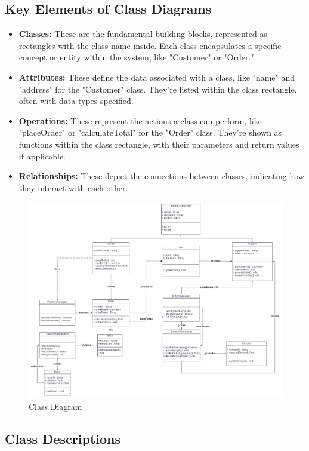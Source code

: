 \subsection{Key Elements of Class Diagrams}
\begin{itemize}
    \item \textbf{Classes:} These are the fundamental building blocks, represented as rectangles with the class name inside. Each class encapsulates a specific concept or entity within the system, like "Customer" or "Order."
    \item \textbf{Attributes:} These define the data associated with a class, like "name" and "address" for the "Customer" class. They’re listed within the class rectangle, often with data types specified.
    \item \textbf{Operations:} These represent the actions a class can perform, like "placeOrder" or "calculateTotal" for the "Order" class. They’re shown as functions within the class rectangle, with their parameters and return values if applicable.
    \item \textbf{Relationships:} These depict the connections between classes, indicating how they interact with each other.
\end{itemize}
\begin{figure}[h]
    \centering
    \includegraphics[width=1\textwidth]{Figures/Class Diagram.png}
    \caption{Class Diagram}
    \label{fig:class-diagram}
\end{figure}
\subsection{Class Descriptions}

